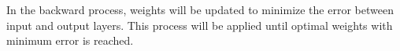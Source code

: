 In the backward process, weights will be updated to minimize the error between input and output layers.
This process will be applied until optimal weights with minimum error is reached.\citep{Hameed2016}



